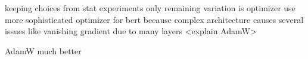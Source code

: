 keeping choices from stat experiments only remaining variation is optimizer
use more sophisticated optimizer for bert because complex architecture causes several issues like vanishing gradient due to many layers
<explain AdamW>

AdamW much better
